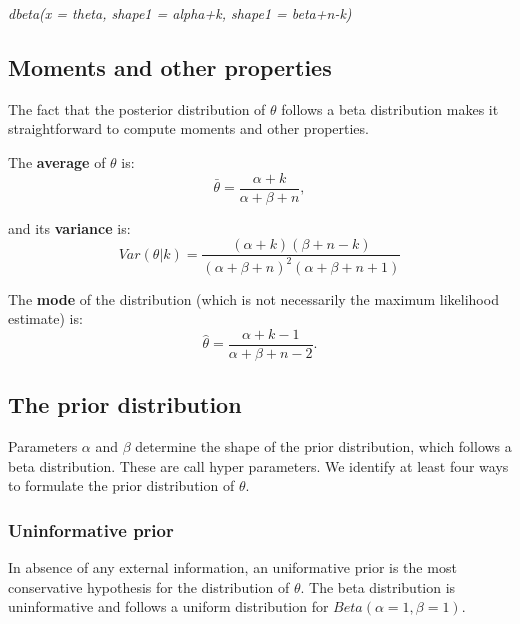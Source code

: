 \documentclass[12pt]{article}
\begin{document}
  \vspace{12pt}
  \noindent\emph{dbeta(x = theta, shape1 = alpha+k, shape1 = beta+n-k)}
  \vspace{12pt}


  \subsection*{Moments and other properties}

  The fact that the posterior distribution of $\theta$ follows a beta distribution makes it straightforward to compute moments and other properties. 

  The \textbf{average} of $\theta$ is: 
      \begin{equation}
        \bar{\theta} = \frac{\alpha+k}{\alpha+\beta+n} ,
        \label{mean}
      \end{equation}


    and its \textbf{variance} is:  
      \begin{equation}
        Var(\theta|k) = \frac{(\alpha + k)(\beta + n - k)}{(\alpha + \beta + n)^{2}(\alpha + \beta + n +1)}
        \label{variance}
      \end{equation}


    The \textbf{mode} of the distribution (which is not necessarily the maximum likelihood estimate) is:
      \begin{equation}
        \hat{\theta} = \frac{\alpha + k - 1}{\alpha + \beta + n - 2} .
        \label{mode}
      \end{equation}


  \subsection*{The prior distribution}
    
  Parameters $\alpha$ and $\beta$ determine the shape of the prior distribution, which follows a beta distribution. These are call hyper parameters. We identify at least four ways to formulate the prior distribution of $\theta$. 


    \subsubsection*{Uninformative prior}
      
      In absence of any external information, an uniformative prior is the most conservative 
      hypothesis for the distribution of $\theta$. The beta distribution is uninformative and follows 
      a uniform distribution for $Beta(\alpha=1,\beta=1)$. 
\end{document}
